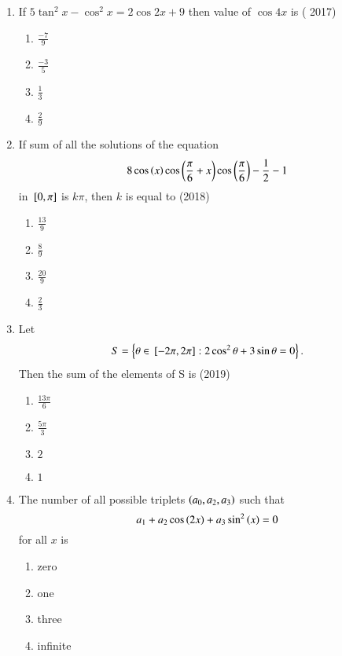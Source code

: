 \begin{enumerate}[label=\thesubsection.\arabic*,ref=\thesubsection.\theenumi]
\item If $5${$\tan^2x-\cos^2x=2\cos2x+9$} then value of $\cos 4x$ is
%
\hfill{( 2017)}
    \begin{multicols}{4}
\begin{enumerate}
    \item $\frac{-7}{9}$ 
    \item $\frac{-3}{5}$
    \item $\frac{1}{3}$
    \item $\frac{2}{9}$
    \end{enumerate}
\end{multicols}
 \item If sum of all the solutions of the equation
\begin{align*}
  8 \cos\left(x\right)  \cos\left(\frac{\pi}{6} + x \right)  \cos \left(\frac{\pi}{6}\right) - \frac{1}{2} - 1 
\end{align*}
 in  ${}\left[0, \pi\right]$ is  $k \pi$,
 then $k$ is equal to
\hfill{(2018)}
\begin{multicols}{4}
\begin{enumerate}
\item $\frac{13}{9}$
\item $\frac{8}{9}$
\item  $\frac{20}{9}$
\item  $\frac{2}{3}$
\end{enumerate}
\end{multicols}
\item Let $$S=\left\{\theta \in {}\left[-2\pi, 2\pi\right] :2\cos^2\theta + 3\sin\theta=0\right\}.$$
 Then the sum of the elements of S is
\hfill {(2019)}
\begin{multicols}{4}
\begin{enumerate}
\item $\frac{13\pi}{6}$ 
\item $\frac{5\pi}{3}$
 \item $2$
 \item $1$
\end{enumerate}
\end{multicols} 
\item The number of all possible triplets $\left(a_0, a_2, a_3\right)$ such that $$a_1 + a_2 \cos\left(2x\right) + a_3\sin^2\left(x\right) = 0$$ for all $x$ is
\hfill{}
\begin{multicols}{5}
\begin{enumerate}
\item zero
\item one
\item three
\item infinite

\end{enumerate}
\end{multicols}
\end{enumerate}
